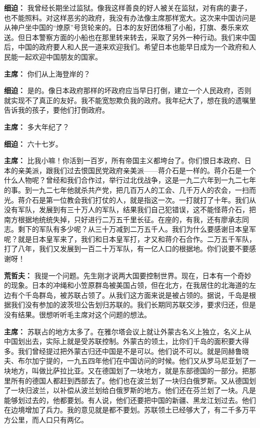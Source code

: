 \begin{duihua}
\item[\textbf{细迫：}] 我曾经长期坐过监狱。像我这样善良的好人被关在监狱，对有病的妻子，也不能照料。对这样恶劣的政府，我没有办法像主席那样宽大。这次来中国访问是从神户坐中国的“燎原”号货轮来的。日本的友好团体租了小船，打旗、奏乐来欢送。但日本警察方面的小船也在那里转来转去，采取了另外一种行动。我们来中国后，中国的政府要人和人民一道来欢迎我们。希望日本也能早日成为一个政府和人民能一起欢迎中国朋友的国家。

\item[\textbf{主席：}] 你们从上海登岸的？

\item[\textbf{细迫：}] 是的。像日本政府那样的坏政府应当早日打倒，建立一个人民政府，否则就实现不了真正的友好。我不能宽恕欺负我的政府。我年纪大了，想在我的遗嘱里告诉我的孩子，要他们打倒政府。

\item[\textbf{主席：}] 多大年纪了？

\item[\textbf{细迫：}] 六十七岁。

\item[\textbf{主席：}] 比我小嘛！你活到一百岁，所有帝国主义都垮台了。你们恨日本政府、日本的亲美派，跟我们过去恨国民党政府亲美派——蒋介石是一样的。蒋介石是一个什么人物呢？曾经和我们合作过，举行过北伐战争，这是一九二六年到一九二七年的事。到一九二七年他就杀共产党，把几百万人的工会、几千万人的农会，一扫而光。蒋介石是第一位教会我们打仗的人，就是指这一次。一打就打了十年。我们从没有军队，发展到有三十万人的军队，结果我们自己犯错误，这不能怪蒋介石，把南方根据地统统失掉，只好进行二万五千里长征。在座的，有我，还有廖承志同志。剩下的军队有多少呢？从三十万减到二万五千人。我们为什么要感谢日本皇军呢？就是日本皇军来了，我们和日本皇军打，才又和蒋介石合作。二万五千军队，打了八年，我们又发展到一百二十万军队，有一亿人口的根据地。你们说要不要感谢呀！

\item[\textbf{荒哲夫：}] 我提一个问题。先生刚才说两大国要控制世界。现在，日本有一个奇妙的现象。日本的冲绳和小笠原群岛被美国占领，但在北方，在我居住的北海道的左边有个千岛群岛，被苏联占领了。从我们这方面来说是被占领的。据说，千岛是根据我们没有参加的波茨坦公告划归苏联的。我们长期同苏联交涉，要求归还，但是没有结果。很想听听毛主席对这个问题的想法。

\item[\textbf{主席：}] 苏联占的地方太多了。在雅尔塔会议上就让外蒙古名义上独立，名义上从中国划出去，实际上就是受苏联控制。外蒙古的领土，比你们千岛的面积要大得多。我们曾经提过把外蒙古归还中国是不是可以。他们说不可以。就是同赫鲁晓夫、布尔加宁提的，一九五四年他们在中国访问的时候。他们又从罗马尼亚划了一块地方，叫做比萨拉比亚。又在德国划了一块地方，就是东部德国的一部分。把那里所有的德国人都赶到西部去了。他们也在波兰划了一块归白俄罗斯。又从德国划了一块归波兰，以补偿从波兰划给白俄罗斯的地方。他们还在芬兰划了一块。凡是能够划过去的，他都要划。有人说，他们还要把中国的新疆、黑龙江划过去。他们在边境增加了兵力。我的意见就是都不要划。苏联领土已经够大了，有二千多万平方公里，而人口只有两亿。


\end{duihua}

